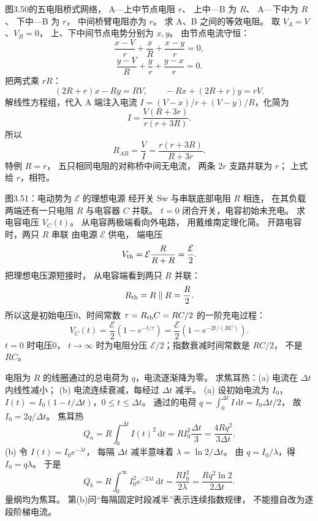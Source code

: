 图3.50的五电阻桥式网络，
A—上中节点电阻 $r$、
上中—B 为 $R$、
A—下中为 $R$、
下中—B 为 $r$，
中间桥臂电阻亦为 $r$。
求 A、B 之间的等效电阻。
\exsolution
取 $V_A=V$、$V_B=0$，
上、下中间节点电势分别为 $x,y$。
由节点电流守恒：
\[
\frac{x-V}r+\frac xR+\frac{x-y}r=0,
\]
\[
\frac{y-V}R+\frac yr+\frac{y-x}r=0.
\]
把两式乘 $rR$：
\[
(2R+r)x-Ry=RV,\qquad
-Rx+(2R+r)y=rV.
\]
解线性方程组，代入 A 端注入电流
$I=(V-x)/r+(V-y)/R$，化简为
\[
I=\frac{V(R+3r)}{r(r+3R)}.
\]
所以
\[
\boxed{R_{AB}=\frac VI
=\frac{r(r+3R)}{R+3r}}.
\]
\excheck 特例 $R=r$，
五只相同电阻的对称桥中间无电流，
两条 $2r$ 支路并联为 $r$；
上式给 $r$，相符。

图3.51：电动势为 $\mathcal E$ 的理想电源
经开关 Sw 与串联底部电阻 $R$ 相连，
在其负载两端还有一只电阻 $R$
与电容器 $C$ 并联。
$t=0$ 闭合开关，电容初始未充电。
求电容电压 $V_C(t)$。
\exsolution
从电容两极端看向外电路，
用戴维南定理化简。
开路电容时，两只 $R$ 串联
由电源 $\mathcal E$ 供电，
端电压
\[
V_{\rm th}=\mathcal E\frac R{R+R}
=\frac{\mathcal E}{2}.
\]
把理想电压源短接时，
从电容端看到两只 $R$ 并联：
\[
R_{\rm th}=R\parallel R=\frac R2.
\]
所以这是初始电压0、时间常数
$\tau=R_{\rm th}C=RC/2$ 的一阶充电过程：
\[
\boxed{V_C(t)=
\frac{\mathcal E}{2}
\left(1-e^{-t/\tau}\right)
=\frac{\mathcal E}{2}
\left(1-e^{-2t/(RC)}\right)}.
\]
\excheck $t=0$ 时电压0，
$t\to\infty$ 时为电阻分压
$\mathcal E/2$；指数衰减时间常数是 $RC/2$，
不是 $RC$。

电阻为 $R$ 的线圈通过的总电荷为 $q$，电流逐渐降为零。
求焦耳热：(a) 电流在 $\Delta t$ 内线性减小；
(b) 电流连续衰减，每经过 $\Delta t$ 减半。
\exsolution
(a) 设初始电流为 $I_0$，
$I(t)=I_0(1-t/\Delta t)$，$0\le t\le\Delta t$。
通过的电荷
$q=\int_0^{\Delta t}I\,\mathrm dt=I_0\Delta t/2$，
故 $I_0=2q/\Delta t$。
焦耳热
\[
Q_a=R\int_0^{\Delta t}I(t)^2\,\mathrm dt
=RI_0^2\frac{\Delta t}{3}
=\boxed{\frac{4Rq^2}{3\Delta t}}.
\]
(b) 令
$I(t)=I_0e^{-\lambda t}$，
每隔 $\Delta t$ 减半意味着
$\lambda=\ln2/\Delta t$。
由 $q=I_0/\lambda$，得 $I_0=q\lambda$。
于是
\[
Q_b=R\int_0^\infty I_0^2e^{-2\lambda t}\,\mathrm dt
=\frac{RI_0^2}{2\lambda}
=\boxed{\frac{Rq^2\ln2}{2\Delta t}}.
\]
\excheck 量纲均为焦耳。
第(b)问“每隔固定时段减半”表示连续指数规律，
不能擅自改为逐段阶梯电流。

